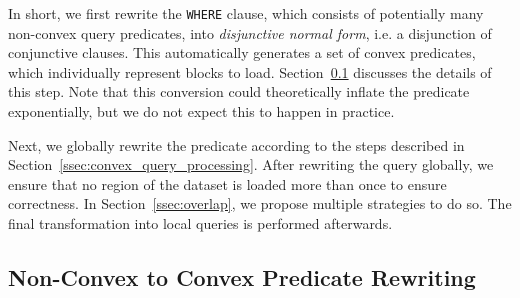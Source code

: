 \documentclass[conference]{IEEEtran}
\newcommand{\smalltt}[1]{{\texttt{\small #1}}}
\begin{document}
%



In short, we first rewrite the \smalltt{WHERE} clause, which consists of potentially many non-convex query predicates, into \textit{disjunctive normal form}, i.e. a disjunction of conjunctive clauses. This automatically generates a set of convex predicates, which individually represent blocks to load. 
Section~\ref{ssec:non_convex_to_convex} discusses the details of this step.
Note that this conversion could theoretically inflate the predicate exponentially, but we do not expect this to happen in practice.

Next, we globally rewrite the predicate according to the steps described in Section~\ref{ssec:convex_query_processing}. After rewriting the query globally, we ensure that no region of the dataset is loaded more than once to ensure correctness. In Section~\ref{ssec:overlap}, we propose multiple strategies to do so. The final transformation into local queries is performed afterwards.

\subsection{Non-Convex to Convex Predicate Rewriting}
\label{ssec:non_convex_to_convex}
\end{document}
